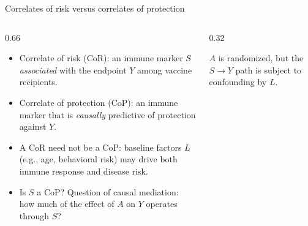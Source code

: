 \documentclass{beamer}
\begin{document}
\begin{frame}[c]{Correlates of risk versus correlates of protection}

\begin{columns}[c]
\begin{column}{0.66\textwidth}
\small
\begin{itemize}
  \itemsep6pt
  \item \alert{Correlate of risk} (CoR): an immune marker $S$
    \textit{associated} with the endpoint $Y$ among vaccine recipients.
  \item \alert{Correlate of protection} (CoP): an immune marker that is
    \textit{causally} predictive of protection against $Y$.
  \item A CoR need not be a CoP: baseline factors $L$ (e.g., age, behavioral
    risk) may drive both immune response and disease risk.
  \item Is $S$ a CoP? Question of \alert{causal mediation}: how much of the
    effect of $A$ on $Y$ operates through $S$?~\citep{gilbert2024four}
\end{itemize}
\end{column}
\begin{column}{0.32\textwidth}
\centering
{}

\vspace{0.5em}
{\footnotesize $A$ is randomized, but the $S \to Y$ path is subject to
confounding by $L$.}
\end{column}
\end{columns}


\end{frame}
\end{document}
